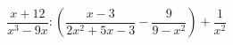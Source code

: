 \begin{ex}[type=expression]
	\begin{condition}
		\(\dfrac{x+12}{x^3-9x}:\left( \dfrac{x-3}{2x^2+5x-3} -\dfrac{9}{9-x^2}\right)+\dfrac{1}{x^2}\)
	\end{condition}
\end{ex}